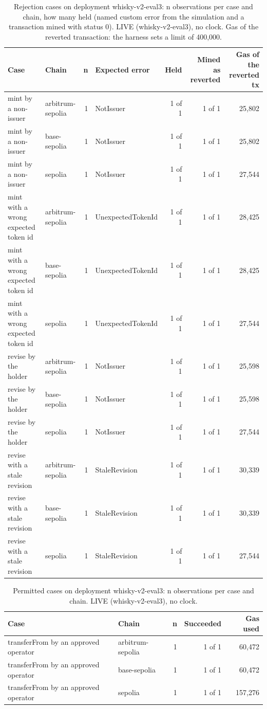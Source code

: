 \begin{table}[htbp]
    \centering
    \small
    \begin{tabular}{llrlrrr}
    \toprule
    Case & Chain & n & Expected error & Held & Mined as reverted & Gas of the reverted tx \\
    \midrule
    mint by a non-issuer & arbitrum-sepolia & 1 & NotIssuer & 1 of 1 & 1 of 1 & 25,802 \\
    mint by a non-issuer & base-sepolia & 1 & NotIssuer & 1 of 1 & 1 of 1 & 25,802 \\
    mint by a non-issuer & sepolia & 1 & NotIssuer & 1 of 1 & 1 of 1 & 27,544 \\
    mint with a wrong expected token id & arbitrum-sepolia & 1 & UnexpectedTokenId & 1 of 1 & 1 of 1 & 28,425 \\
    mint with a wrong expected token id & base-sepolia & 1 & UnexpectedTokenId & 1 of 1 & 1 of 1 & 28,425 \\
    mint with a wrong expected token id & sepolia & 1 & UnexpectedTokenId & 1 of 1 & 1 of 1 & 27,544 \\
    revise by the holder & arbitrum-sepolia & 1 & NotIssuer & 1 of 1 & 1 of 1 & 25,598 \\
    revise by the holder & base-sepolia & 1 & NotIssuer & 1 of 1 & 1 of 1 & 25,598 \\
    revise by the holder & sepolia & 1 & NotIssuer & 1 of 1 & 1 of 1 & 27,544 \\
    revise with a stale revision & arbitrum-sepolia & 1 & StaleRevision & 1 of 1 & 1 of 1 & 30,339 \\
    revise with a stale revision & base-sepolia & 1 & StaleRevision & 1 of 1 & 1 of 1 & 30,339 \\
    revise with a stale revision & sepolia & 1 & StaleRevision & 1 of 1 & 1 of 1 & 27,544 \\
    \bottomrule
    \end{tabular}
    \caption{Rejection cases on deployment whisky-v2-eval3: n observations per case and chain, how many held (named custom error from the simulation and a transaction mined with status 0). LIVE (whisky-v2-eval3), no clock. Gas of the reverted transaction: the harness sets a limit of 400,000.}
    \label{tab:edge-rejections}
\end{table}

\begin{table}[htbp]
    \centering
    \small
    \begin{tabular}{llrrr}
    \toprule
    Case & Chain & n & Succeeded & Gas used \\
    \midrule
    transferFrom by an approved operator & arbitrum-sepolia & 1 & 1 of 1 & 60,472 \\
    transferFrom by an approved operator & base-sepolia & 1 & 1 of 1 & 60,472 \\
    transferFrom by an approved operator & sepolia & 1 & 1 of 1 & 157,276 \\
    \bottomrule
    \end{tabular}
    \caption{Permitted cases on deployment whisky-v2-eval3: n observations per case and chain. LIVE (whisky-v2-eval3), no clock.}
    \label{tab:edge-permitted}
\end{table}

